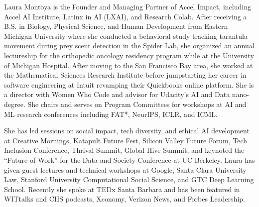 \documentclass[conference]{IEEEtran}
\begin{document}
\begin{IEEEbiography}{Laura Montoya}
is the Founder and Managing Partner of Accel Impact, including Accel AI Institute, Latinx in AI (LXAI), and Research Colab. After receiving a B.S. in Biology, Physical Science, and Human Development from Eastern Michigan University where she conducted a behavioral study tracking tarantula movement during prey scent detection in the Spider Lab, she organized an annual lectureship for the orthopedic oncology residency program while at the University of Michigan Hospital. After moving to the San Francisco Bay area, she worked at the Mathematical Sciences Research Institute before jumpstarting her career in software engineering at Intuit revamping their Quickbooks online platform. She is a director with Women Who Code and advisor for Udacity’s AI and Data nano-degree. She chairs and serves on Program Committees for workshops at AI and ML research conferences including FAT*, NeurIPS, ICLR, and ICML. 

She has led sessions on social impact, tech diversity, and ethical AI development at Creative Mornings, Katapult Future Fest, Silicon Valley Future Forum, Tech Inclusion Conference, Thrival Summit, Global Hive Summit, and keynoted the “Future of Work” for the Data and Society Conference at UC Berkeley. Laura has given guest lectures and technical workshops at Google, Santa Clara University Law, Stanford University Computational Social Science, and GTC Deep Learning School. Recently she spoke at TEDx Santa Barbara and has been featured in WITtalks and CIIS podcasts, Xconomy, Verizon News, and Forbes Leadership.  

\end{IEEEbiography}
\end{document}
